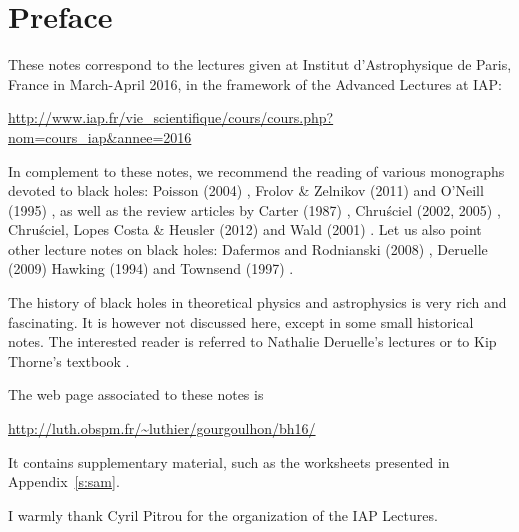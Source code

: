 \chapter*{Preface}

These notes correspond to the lectures given at
Institut d'Astrophysique de Paris, France in March-April 2016, in the
framework of the Advanced Lectures at IAP:

\centerline{\url{http://www.iap.fr/vie_scientifique/cours/cours.php?nom=cours_iap&annee=2016}}

\vspace{2ex}

In complement to these notes, we recommend the reading of various monographs
devoted to black holes: Poisson (2004) \cite{Poiss04}, Frolov \& Zelnikov (2011) \cite{FroloZ11}
and O'Neill (1995) \cite{ONeil95}, as well as the review
articles by Carter (1987) \cite{Carte87}, Chru\'sciel (2002, 2005) \cite{Chrus02, Chrus05},
Chru\'sciel, Lopes Costa \& Heusler (2012) \cite{ChrusLH12} and Wald (2001) \cite{Wald01}.
Let us also point other lecture notes on black holes:
Dafermos and Rodnianski (2008) \cite{DaferR13},  Deruelle (2009) \cite{Derue09}
Hawking (1994) \cite{Hawki94,HawkiP15} and Townsend (1997) \cite{Towns97}.

The history of black holes in theoretical physics and astrophysics is
very rich and fascinating. It is however not discussed here, except in some
small historical notes. The interested
reader is referred to Nathalie Deruelle's lectures \cite{Derue09} or to Kip Thorne's
textbook \cite{Thorn94}.


The web page associated to these notes is

\centerline{\url{http://luth.obspm.fr/~luthier/gourgoulhon/bh16/}}

It contains supplementary material, such as the worksheets presented in
Appendix~\ref{s:sam}.

\vspace{2ex}

I warmly thank Cyril Pitrou for the organization of the IAP Lectures.
